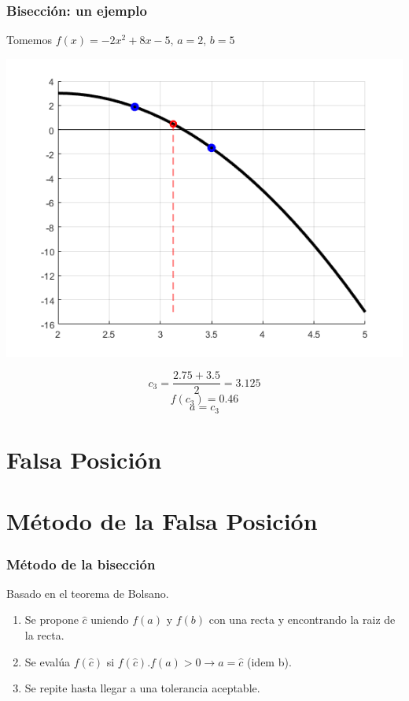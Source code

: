 \documentclass[xcolor=svgnames]{beamer} %
\theoremstyle{plain}
\theoremstyle{definition}
\begin{document}
\begin{frame}
\frametitle{Bisección: un ejemplo}
Tomemos $f(x) = -2x^2+8x-5, \, a=2, \, b=5$
\begin{minipage}{.7\linewidth}
\includegraphics[scale=.5]{Biseccion/f5.png} 
\end{minipage}
\begin{minipage}{.25\linewidth}
$$c_3 = \frac{2.75+3.5}{2} = 3.125 $$\vspace{7pt}
$$f(c_3) = 0.46 $$\vspace{7pt}
$$ a = c_3$$
\end{minipage}
\end{frame}


\section{Falsa Posición}

\section{Método de la Falsa Posición}
\begin{frame}
\frametitle{Método de la bisección}

Basado en el teorema de Bolsano.\vspace{12pt}


\begin{enumerate}
  \item Se propone $\hat c$ uniendo $f(a)$ y $f(b)$ con una recta y encontrando la raiz de la recta.
  \item Se evalúa $f(\hat c)$ si $f(\hat c).f(a)>0 \rightarrow  a=\hat c$ (idem b). 
  \item  Se repite hasta llegar a una tolerancia aceptable.
\end{enumerate}

\end{frame}
\end{document}
